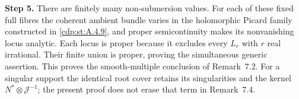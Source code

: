 \noindent\textbf{Step 5.} There are finitely many non-submersion values. For each of these fixed full fibres the coherent ambient bundle varies in the holomorphic Picard family constructed in \ref{cdp:st:A.4.9}, and proper semicontinuity makes its nonvanishing locus analytic. Each locus is proper because it excludes every $L_r$ with $r$ real irrational. Their finite union is proper, proving the simultaneous generic assertion. This proves the smooth-multiple conclusion of Remark~7.2. For a singular support the identical root cover retains its singularities and the kernel $N^*\otimes\mathcal J^{-1}$; the present proof does not erase that term in Remark~7.4.
